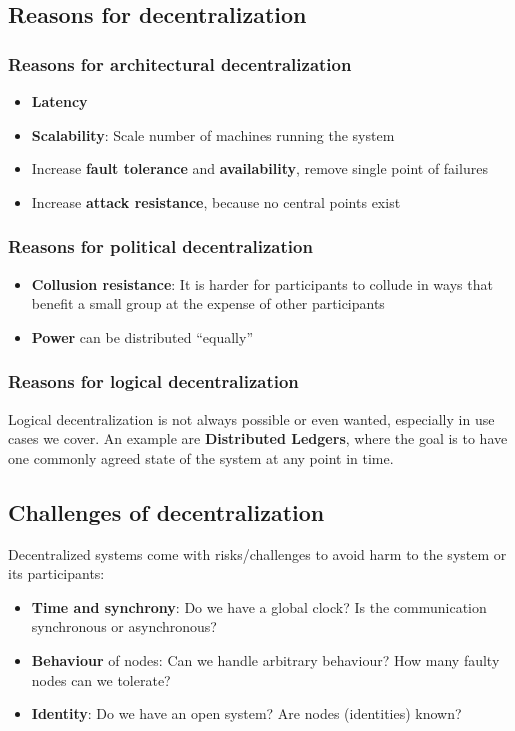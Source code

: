 \documentclass[12pt,A4]{extarticle}
\begin{document}
\subsection{Reasons for decentralization}
\subsubsection{Reasons for architectural decentralization}
\begin{itemize}
  \item{\textbf{Latency}}
  \item{\textbf{Scalability}: Scale number of machines running the system}
  \item{Increase \textbf{fault tolerance} and \textbf{availability}, remove single point of failures}
  \item{Increase \textbf{attack resistance}, because no central points exist}
\end{itemize}

\subsubsection{Reasons for political decentralization}
\begin{itemize}
  \item{\textbf{Collusion resistance}: It is harder for participants to collude in ways that benefit a small group at the expense of other participants}
  \item{\textbf{Power} can be distributed ``equally''}
\end{itemize}

\subsubsection{Reasons for logical decentralization}
Logical decentralization is not always possible or even wanted, especially in use cases we cover. An example are \textbf{Distributed Ledgers}, where the goal is to have one commonly agreed state of the system at any point in time.

\subsection{Challenges of decentralization}
Decentralized systems come with risks/challenges to avoid harm to the system or its participants:
\begin{itemize}
  \item{\textbf{Time and synchrony}: Do we have a global clock? Is the communication synchronous or asynchronous?}
  \item{\textbf{Behaviour} of nodes: Can we handle arbitrary behaviour? How many faulty nodes can we tolerate?}
  \item{\textbf{Identity}: Do we have an open system? Are nodes (identities) known?}
\end{itemize}

\newpage


\end{document}
